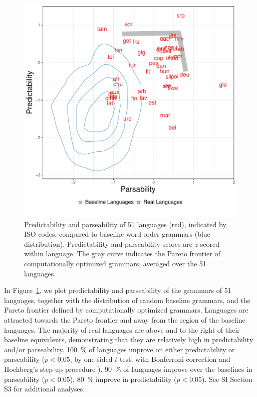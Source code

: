 \documentclass[9pt,twocolumn,twoside,lineno]{pnas-new}
\begin{document}
\begin{figure}
    \centering
    \includegraphics[scale=.5]{../results/plane/pareto-plane-iso-best-balanced-legend-viz-10-fontsize.pdf} %
    \caption{Predictability and parseability of 51 languages (red), indicated by ISO codes, compared to baseline word order grammars (blue distribution). Predictability and parseability scores are $z$-scored within language. The gray curve indicates the Pareto frontier of computationally optimized grammars, averaged over the 51 languages.} 
    \label{fig:pareto-plane}
\end{figure}

In Figure~\ref{fig:pareto-plane}, we plot predictability and parseability of the grammars of 51 languages, together with the distribution of random baseline grammars, and the Pareto frontier defined by computationally optimized grammars.
Languages are attracted towards the Pareto frontier and away from the region of the baseline languages.
The majority of real languages are above and to the right of their baseline equivalents, demonstrating that they are relatively high in predictability and/or parseability.
100~\% of languages improve on either predictability or parseability ($p<0.05$, by one-sided $t$-test, with Bonferroni correction and Hochberg's step-up procedure \cite{hochberg1988sharper}).
90~\% of languages improve over the baselines in parseability ($p < 0.05$), 80~\% improve in predictability ($p < 0.05$).
See SI Section S3 for additional analyses.
\end{document}
